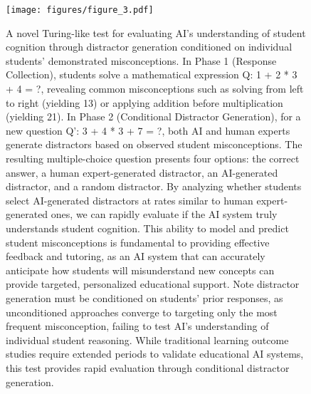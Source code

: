 \begin{figure}[t!]
    \centering
    \texttt{[image: figures/figure\_3.pdf]}
    \caption{
    A novel Turing-like test for evaluating AI's understanding of student cognition through distractor generation conditioned on individual students' demonstrated misconceptions. In Phase 1 (Response Collection), students solve a mathematical expression Q: 1 + 2 * 3 + 4 = ?, revealing common misconceptions such as solving from left to right (yielding 13) or applying addition before multiplication (yielding 21). In Phase 2 (Conditional Distractor Generation), for a new question Q': 3 + 4 * 3 + 7 = ?, both AI and human experts generate distractors based on observed student misconceptions. The resulting multiple-choice question presents four options: the correct answer, a human expert-generated distractor, an AI-generated distractor, and a random distractor. By analyzing whether students select AI-generated distractors at rates similar to human expert-generated ones, we can rapidly evaluate if the AI system truly understands student cognition. This ability to model and predict student misconceptions is fundamental to providing effective feedback and tutoring, as an AI system that can accurately anticipate how students will misunderstand new concepts can provide targeted, personalized educational support. Note distractor generation must be conditioned on students' prior responses, as unconditioned approaches converge to targeting only the most frequent misconception, failing to test AI's understanding of individual student reasoning. While traditional learning outcome studies require extended periods to validate educational AI systems, this test provides rapid evaluation through conditional distractor generation.}
    \label{fig:Example}
\end{figure}